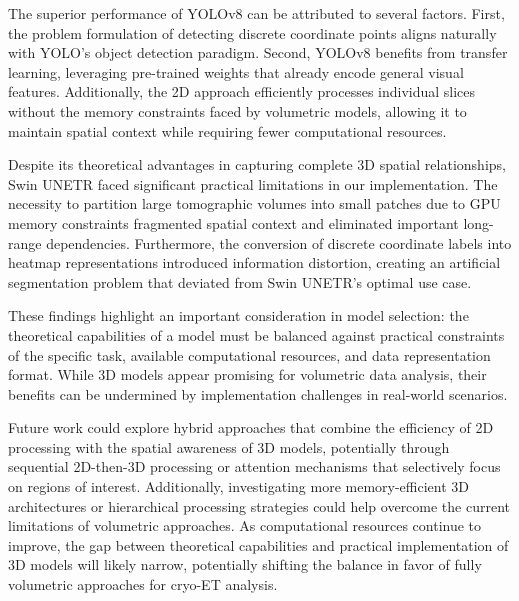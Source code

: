 \documentclass{article}
\begin{document}
The superior performance of YOLOv8 can be attributed to several factors. First, the problem formulation of detecting discrete coordinate points aligns naturally with YOLO's object detection paradigm. Second, YOLOv8 benefits from transfer learning, leveraging pre-trained weights that already encode general visual features. Additionally, the 2D approach efficiently processes individual slices without the memory constraints faced by volumetric models, allowing it to maintain spatial context while requiring fewer computational resources.

Despite its theoretical advantages in capturing complete 3D spatial relationships, Swin UNETR faced significant practical limitations in our implementation. The necessity to partition large tomographic volumes into small patches due to GPU memory constraints fragmented spatial context and eliminated important long-range dependencies. Furthermore, the conversion of discrete coordinate labels into heatmap representations introduced information distortion, creating an artificial segmentation problem that deviated from Swin UNETR's optimal use case.

These findings highlight an important consideration in model selection: the theoretical capabilities of a model must be balanced against practical constraints of the specific task, available computational resources, and data representation format. While 3D models appear promising for volumetric data analysis, their benefits can be undermined by implementation challenges in real-world scenarios.

Future work could explore hybrid approaches that combine the efficiency of 2D processing with the spatial awareness of 3D models, potentially through sequential 2D-then-3D processing or attention mechanisms that selectively focus on regions of interest. Additionally, investigating more memory-efficient 3D architectures or hierarchical processing strategies could help overcome the current limitations of volumetric approaches. As computational resources continue to improve, the gap between theoretical capabilities and practical implementation of 3D models will likely narrow, potentially shifting the balance in favor of fully volumetric approaches for cryo-ET analysis.



\vfill\pagebreak






\end{document}
